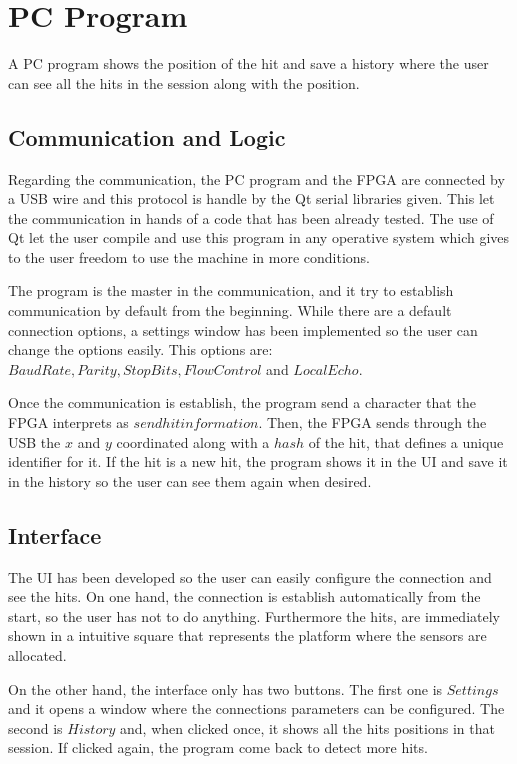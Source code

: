 \chapter{PC Program}
\label{chap:pc_program}
	A PC program shows the position of the hit and save a history where the user can see all the hits in the session along with the position.

	\section{Communication and Logic}
	\label{sec:pc_program_com}
		Regarding the communication, the PC program and the FPGA are connected by a USB wire and this protocol is handle by the Qt serial libraries given. 
		This let the communication in hands of a code that has been already tested. 
		The use of Qt let the user compile and use this program in any operative system which gives to the user freedom to use the machine in more conditions.

		The program is the master in the communication, and it try to establish communication by default from the beginning. 
		While there are a default connection options, a settings window has been implemented so the user can change the options easily. 
		This options are: $Baud Rate, Parity, Stop Bits, Flow Control$ and $Local Echo$.

		Once the communication is establish, the program send a character that the FPGA interprets as $send hit information$. 
		Then, the FPGA sends through the USB the $x$ and $y$ coordinated along with a $hash$ of the hit, that defines a unique identifier for it. 
		If the hit is a new hit, the program shows it in the UI and save it in the history so the user can see them again when desired.

	\section{Interface}
	\label{sec:pc_program_interface}
		The UI has been developed so the user can easily configure the connection and see the hits. 
		On one hand, the connection is establish automatically from the start, so the user has not to do anything. Furthermore the hits, are immediately shown in a intuitive square that represents the platform where the sensors are allocated.

		On the other hand, the interface only has two buttons. The first one is $Settings$ and it opens a window where the connections parameters can be configured. The second is $History$ and, when clicked once, it shows all the hits positions in that session. If clicked again, the program come back to detect more hits.

